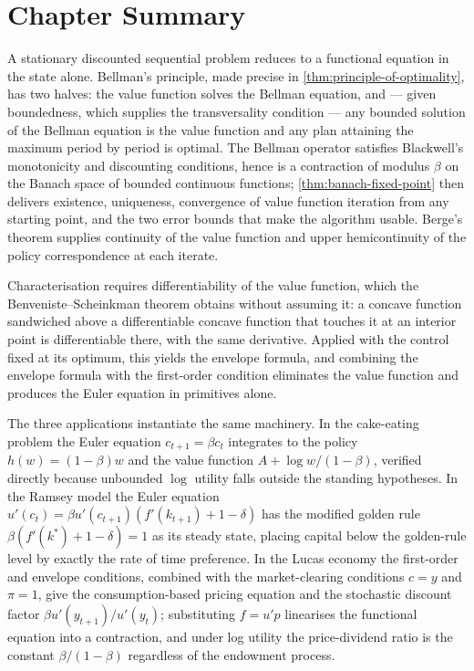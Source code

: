\section{Chapter Summary}\label{sec:dyn-summary}

A stationary discounted sequential problem reduces to a functional equation in
the state alone. Bellman's principle, made precise in
\autoref{thm:principle-of-optimality}, has two halves: the value function solves
the Bellman equation, and --- given boundedness, which supplies the transversality
condition --- any bounded solution of the Bellman equation is the value function
and any plan attaining the maximum period by period is optimal. The Bellman
operator satisfies Blackwell's monotonicity and discounting conditions, hence is
a contraction of modulus $\beta$ on the Banach space of bounded continuous
functions; \autoref{thm:banach-fixed-point} then delivers existence, uniqueness,
convergence of value function iteration from any starting point, and the two
error bounds that make the algorithm usable. Berge's theorem supplies continuity
of the value function and upper hemicontinuity of the policy correspondence at
each iterate.

Characterisation requires differentiability of the value function, which the
Benveniste--Scheinkman theorem obtains without assuming it: a concave function
sandwiched above a differentiable concave function that touches it at an interior
point is differentiable there, with the same derivative. Applied with the control
fixed at its optimum, this yields the envelope formula, and combining the
envelope formula with the first-order condition eliminates the value function and
produces the Euler equation in primitives alone.

The three applications instantiate the same machinery. In the cake-eating problem
the Euler equation $c_{t+1}=\beta c_t$ integrates to the policy
$h(w)=(1-\beta)w$ and the value function
$A+\log w/(1-\beta)$, verified directly because unbounded $\log$ utility falls
outside the standing hypotheses. In the Ramsey model the Euler equation
$u'(c_t)=\beta u'(c_{t+1})(f'(k_{t+1})+1-\delta)$ has the modified golden rule
$\beta(f'(k^{\ast})+1-\delta)=1$ as its steady state, placing capital below the
golden-rule level by exactly the rate of time preference. In the Lucas economy the
first-order and envelope conditions, combined with the market-clearing conditions
$c=y$ and $\pi=1$, give the consumption-based pricing equation and the stochastic
discount factor $\beta u'(y_{t+1})/u'(y_t)$; substituting $f=u'p$ linearises the
functional equation into a contraction, and under log utility the price-dividend
ratio is the constant $\beta/(1-\beta)$ regardless of the endowment process.


